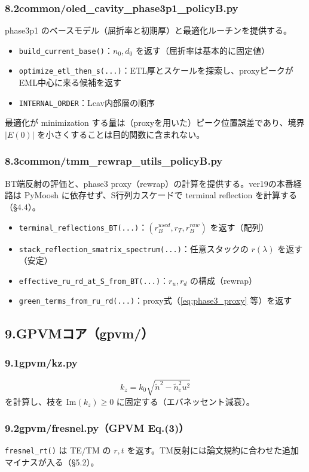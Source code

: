 \documentclass[a4paper,11pt]{jsarticle} %
\begin{document}
\subsubsection*{8.2\;common/oled\_cavity\_phase3p1\_policyB.py}
phase3p1 のベースモデル（屈折率と初期厚）と最適化ルーチンを提供する。
\begin{itemize}
\item \texttt{build\_current\_base()}：$n_0,d_0$ を返す（屈折率は基本的に固定値）
\item \texttt{optimize\_etl\_then\_s(...)}：ETL厚とスケールを探索し、proxyピークがEML中心に来る候補を返す
\item \texttt{INTERNAL\_ORDER}：Lcav内部層の順序
\end{itemize}

最適化が minimization する量は（proxyを用いた）ピーク位置誤差であり、境界 $|E(0)|$ を小さくすることは目的関数に含まれない。

\subsubsection*{8.3\;common/tmm\_rewrap\_utils\_policyB.py}
BT端反射の評価と、phase3 proxy（rewrap）の計算を提供する。ver19の本番経路は PyMoosh に依存せず、S行列カスケードで terminal reflection を計算する（\S4.4）。
\begin{itemize}
\item \texttt{terminal\_reflections\_BT(...)}：$(r_B^{used}, r_T, r_B^{raw})$ を返す（配列）
\item \texttt{stack\_reflection\_smatrix\_spectrum(...)}：任意スタックの $r(\lambda)$ を返す（安定）
\item \texttt{effective\_ru\_rd\_at\_S\_from\_BT(...)}：$r_u,r_d$ の構成（rewrap）
\item \texttt{green\_terms\_from\_ru\_rd(...)}：proxy式（\eqref{eq:phase3_proxy} 等）を返す
\end{itemize}

\subsection*{9.\;GPVMコア（gpvm/）}
\subsubsection*{9.1\;gpvm/kz.py}
\[
k_z=k_0\sqrt{\tilde n^2-\tilde n_e^2u^2}
\]
を計算し、枝を $\mathrm{Im}(k_z)\ge 0$ に固定する（エバネッセント減衰）。

\subsubsection*{9.2\;gpvm/fresnel.py（GPVM Eq.(3)）}
\texttt{fresnel\_rt()} は TE/TM の $r,t$ を返す。TM反射には論文規約に合わせた追加マイナスが入る（\S5.2）。
\end{document}
